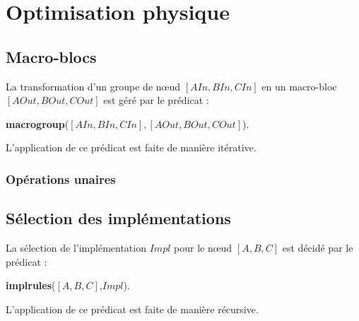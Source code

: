 \section{Optimisation physique}\label{sec:contrib:astronef:physique}

\subsection{Macro-blocs}
\begin{regle}
La transformation d'un groupe de nœud $[AIn,BIn,CIn]$ en un macro-bloc $[AOut,BOut,COut]$ est géré par le prédicat :
\begin{center} \textbf{macrogroup}($[AIn,BIn,CIn],[AOut,BOut,COut]$).\end{center}
L'application de ce prédicat est faite de manière itérative.
\end{regle}

\subsubsection{Opérations unaires}


\subsection{Sélection des implémentations}
\begin{regle}
La sélection de l'implémentation $Impl$ pour le nœud $[A,B,C]$ est décidé par le prédicat :
\begin{center} \textbf{implrules}($[A,B,C]$,$Impl$).\end{center}
L'application de ce prédicat est faite de manière récursive.
\end{regle}
